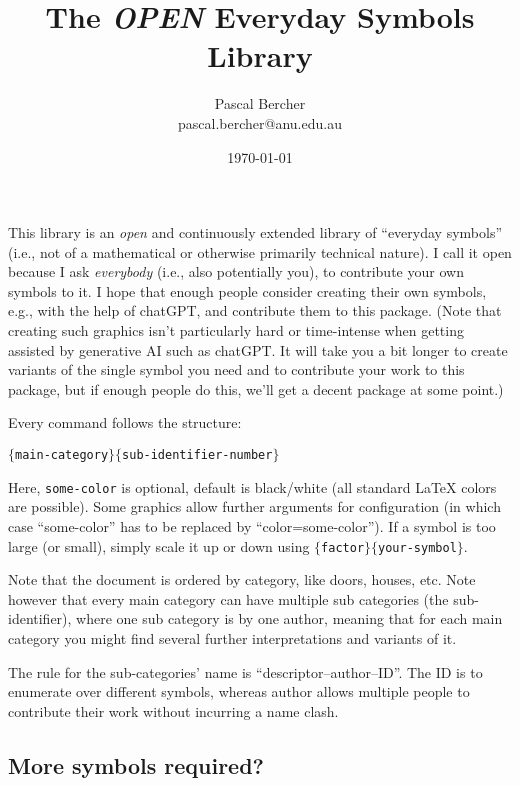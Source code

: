 \documentclass{article}
\begin{document}
\title{The \emph{OPEN} Everyday Symbols Library}
\author{Pascal Bercher\\pascal.bercher@anu.edu.au}
\date{\today}

\maketitle

This library is an \emph{open} and continuously extended library of ``everyday symbols'' (i.e., not of a mathematical or otherwise primarily technical nature). I call it open because I ask \emph{everybody} (i.e., also potentially you), to contribute your own symbols to it. I hope that enough people consider creating their own symbols, e.g., with the help of chatGPT, and contribute them to this package. (Note that creating such graphics isn't particularly hard or time-intense when getting assisted by generative AI such as chatGPT. It will take you a bit longer to create variants of the single symbol you need and to contribute your work to this package, but if enough people do this, we'll get a decent package at some point.)

\medskip
Every command follows the structure:
\begin{center}
  \texttt{\string{}$\{$main-category$\}\{$sub-identifier-number$\}$}
\end{center}
Here, \texttt{some-color} is optional, default is black/white (all standard \LaTeX{} colors are possible). Some graphics allow further arguments for configuration (in which case ``some-color'' has to be replaced by ``color=some-color''). If a symbol is too large (or small), simply scale it up or down using
\texttt{\string\scalebox$\{$factor$\}\{$your-symbol$\}$}.

\medskip
Note that the document is ordered by category, like doors, houses, etc. Note however that every main category can have multiple sub categories (the sub-identifier), where one sub category is by one author, meaning that for each main category you might find several further interpretations and variants of it. 

\medskip
The rule for the sub-categories' name is ``descriptor--author--ID''. The ID is to enumerate over different symbols, whereas author allows multiple people to contribute their work without incurring a name clash.

\subsection*{More symbols required?}
\end{document}
